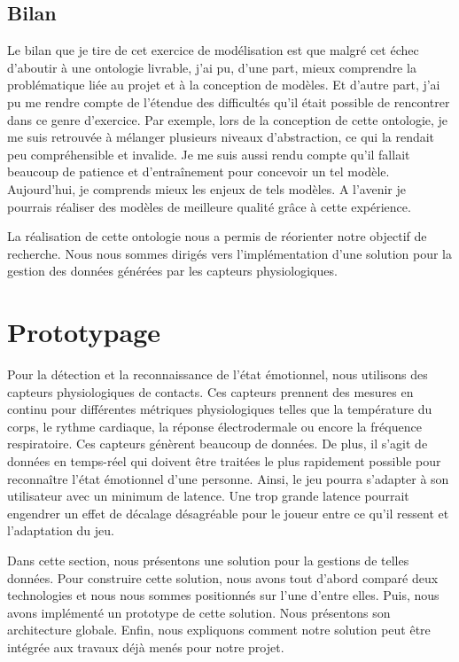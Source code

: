 \documentclass{article}
\begin{document}
	\subsection{Bilan}\label{sec:modelbilan}
		Le bilan que je tire de cet exercice de modélisation est que malgré cet échec d'aboutir à une ontologie livrable, j'ai pu, d'une part, mieux comprendre la problématique liée au projet et à la conception de modèles.
		Et d'autre part, j'ai pu me rendre compte de l'étendue des difficultés qu'il  était possible de rencontrer dans ce genre d'exercice.
		Par exemple, lors de la conception de cette ontologie, je me suis retrouvée à mélanger plusieurs niveaux d'abstraction, ce qui la rendait peu compréhensible et invalide. 
		Je me suis aussi rendu compte qu'il fallait beaucoup de patience et d'entraînement pour concevoir un tel modèle. 
		Aujourd'hui, je comprends mieux les enjeux de tels modèles. 
		A l'avenir je pourrais réaliser des modèles de meilleure qualité grâce à cette expérience.\par
		La réalisation de cette ontologie nous a permis de réorienter notre objectif de recherche.
		Nous nous sommes dirigés vers l'implémentation d'une solution pour la gestion des données générées par les capteurs physiologiques.

\section{Prototypage}\label{sec:prototypage}
	Pour la détection et la reconnaissance de l'état émotionnel, nous utilisons des capteurs physiologiques de contacts.
	Ces capteurs prennent des mesures en continu pour différentes métriques physiologiques telles que la température du corps, le rythme cardiaque, la réponse électrodermale ou encore la fréquence respiratoire.
	Ces capteurs génèrent beaucoup de données.
	De plus, il s'agit de données en temps-réel qui doivent être traitées le plus rapidement possible pour reconnaître l'état émotionnel d'une personne. 
	Ainsi, le jeu pourra s'adapter à son utilisateur avec un minimum de latence. 
	Une trop grande latence pourrait engendrer un effet de décalage désagréable pour le joueur entre ce qu'il ressent et l'adaptation du jeu.\par
	Dans cette section, nous présentons une solution pour la gestions de telles données. Pour construire cette solution, nous avons tout d'abord comparé deux technologies et nous nous sommes positionnés sur l'une d'entre elles.
	Puis, nous avons implémenté un prototype de cette solution.
	Nous présentons son architecture globale.
	Enfin, nous expliquons comment notre solution peut être intégrée aux travaux déjà menés pour notre projet.
\end{document}
